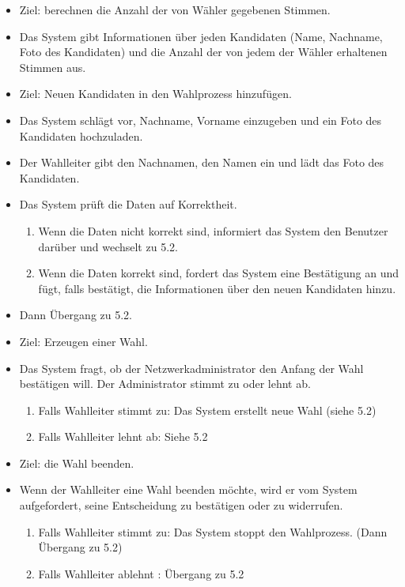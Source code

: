 \documentclass[parskip=full,11pt,twoside]{scrartcl}
\begin{document}
\begin{itemize}
	\item Ziel: berechnen die Anzahl der von Wähler gegebenen Stimmen.
	\item Das System gibt Informationen über jeden Kandidaten (Name, Nachname, Foto des Kandidaten) und die Anzahl der von jedem der Wähler erhaltenen Stimmen aus.
\end{itemize}


\begin{itemize}
	\item Ziel: Neuen Kandidaten in den Wahlprozess hinzufügen.
	\item Das System schlägt vor, Nachname, Vorname einzugeben und ein Foto des Kandidaten hochzuladen.
	\item Der Wahlleiter gibt den Nachnamen, den Namen ein und lädt das Foto des Kandidaten.
	\item Das System prüft die Daten auf Korrektheit.
	\begin{enumerate}
		\item Wenn die Daten nicht korrekt sind, informiert das System den Benutzer darüber und wechselt zu 5.2.
		\item Wenn die Daten korrekt sind, fordert das System eine Bestätigung an und fügt, falls bestätigt, die Informationen über den neuen Kandidaten hinzu.
	\end{enumerate}
	\item Dann Übergang zu 5.2.
\end{itemize}


\begin{itemize}
	\item Ziel: Erzeugen einer Wahl.
	\item Das System fragt, ob der Netzwerkadministrator den Anfang der Wahl bestätigen will.
	Der Administrator stimmt zu oder lehnt ab.
	\begin{enumerate}
		\item Falls Wahlleiter stimmt zu: Das System erstellt neue Wahl (siehe 5.2)
		\item Falls Wahlleiter lehnt ab: Siehe 5.2
	\end{enumerate}
\end{itemize}


\begin{itemize}
	\item Ziel: die Wahl beenden.
	\item Wenn der Wahlleiter eine Wahl beenden möchte, wird er vom System aufgefordert, seine Entscheidung zu bestätigen oder zu widerrufen.
	\begin{enumerate}
		\item Falls Wahlleiter stimmt zu: Das System stoppt den Wahlprozess. (Dann Übergang zu 5.2)
		\item Falls Wahlleiter ablehnt : Übergang zu 5.2
	\end{enumerate}
\end{itemize}
\end{document}
